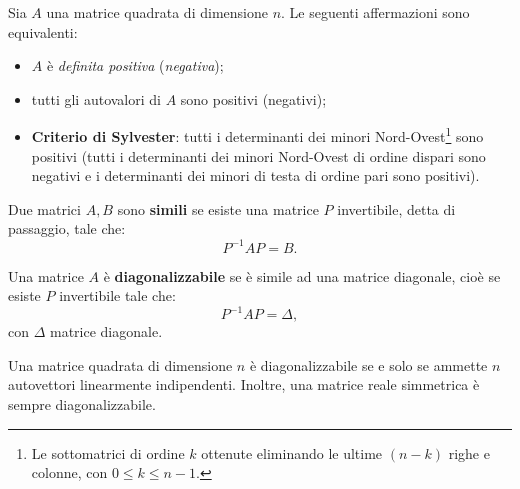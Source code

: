 \begin{theorem}
	Sia $A$ una matrice quadrata di dimensione $n$.
  Le seguenti affermazioni sono equivalenti:
	\begin{itemize}
		\item $A$ è \textit{definita positiva} (\textit{negativa});
		\item tutti gli autovalori di $A$ sono positivi (negativi);
		\item \textbf{Criterio di Sylvester}: tutti i determinanti dei minori Nord-Ovest\footnote{Le sottomatrici di ordine $k$ ottenute eliminando le ultime $( n-k)$ righe e colonne, con $0\leqslant k\leqslant n-1$.} sono positivi (tutti i determinanti dei minori Nord-Ovest di ordine dispari sono negativi e i determinanti dei minori di testa di ordine pari sono positivi).
	\end{itemize}
	\label{thm:matrice-definita-positiva-negativa}
\end{theorem}
\begin{definition}
	Due matrici $A,B$ sono \textbf{simili} se esiste una matrice $P$ invertibile, detta di passaggio, tale che:
	\begin{equation*}
		P^{-1} AP=B.
	\end{equation*}
\end{definition}
\begin{definition}
	Una matrice $A$ è \textbf{diagonalizzabile} se è simile ad una matrice diagonale, cioè se esiste $P$ invertibile tale che:
	\begin{equation*}
		P^{-1} AP=\Delta ,
	\end{equation*}
	con $\Delta $ matrice diagonale.
\end{definition}
\begin{theorem}
	Una matrice quadrata di dimensione $n$ è diagonalizzabile se e solo se ammette $n$ autovettori linearmente indipendenti.
  Inoltre, una matrice reale simmetrica è sempre diagonalizzabile.
\end{theorem}

